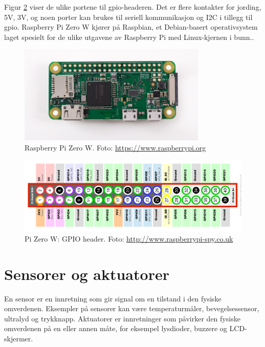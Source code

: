 Figur \ref{fig:pizero_gpio} viser de ulike portene til \gls{gpio}-headeren. Det er flere kontakter for
jording, 5V, 3V, og noen porter kan brukes til seriell kommunikasjon og I2C i tillegg til \gls{gpio}.
Raspberry Pi Zero W kjører på Raspbian, et Debian-basert operativsystem laget spesielt for de ulike utgavene av
Raspberry Pi med Linux-kjernen i bunn..

\begin{figure}
\includegraphics[width=0.8\textwidth,center]{fig/pizero}
\caption{Raspberry Pi Zero W. Foto: \url{https://www.raspberrypi.org}}
\label{fig:pizero}
\end{figure}

\begin{figure}
\includegraphics[width=1.0\textwidth,center]{fig/pizero_gpio}
\caption{Pi Zero W: GPIO header. Foto: \url{http://www.raspberrypi-spy.co.uk}}
\label{fig:pizero_gpio}
\end{figure}

\section{Sensorer og aktuatorer}
En sensor er en innretning som gir signal om en tilstand i den fysiske omverdenen. Eksempler
på sensorer kan være temperaturmåler, bevegelsessensor, ultralyd og trykknapp. Aktuatorer er innretninger som påvirker
den fysiske omverdenen på en eller annen måte, for eksempel lysdioder, buzzere og LCD-skjermer.

